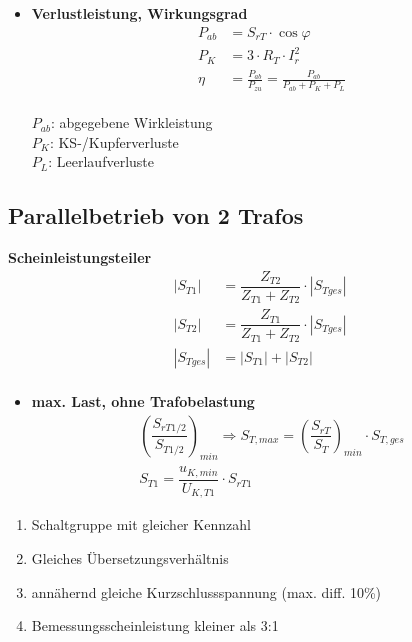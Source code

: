 \begin{itemize}
    \item[]{\textbf{Verlustleistung, Wirkungsgrad}}
\begin{align*}
    P_{ab} &= S_{rT} \cdot \cos \varphi\\
    P_K &= 3 \cdot R_T \cdot I^2_r\\
    \eta &= \frac{P_{ab}}{P_{zu}} = \frac{P_{ab}}{P_{ab}+P_K+P_L}
\end{align*}\\
$P_{ab}$: abgegebene Wirkleistung\\
$P_K$: KS-/Kupferverluste\\
$P_L$: Leerlaufverluste

\end{itemize}

\subsection{Parallelbetrieb von 2 Trafos}
\textbf{Scheinleistungsteiler}
\begin{align*}
    |S_{T1}| &= \dfrac{Z_{T2}}{Z_{T1} + Z_{T2}} \cdot |S_{Tges}|\\
    |S_{T2}| &= \dfrac{Z_{T1}}{Z_{T1} + Z_{T2}} \cdot |S_{Tges}|\\
    |S_{Tges}| &= |S_{T1}| + |S_{T2}|\\
\end{align*}
\begin{itemize}
    \item[]{\textbf{max. Last, ohne Trafobelastung}}
    \begin{gather*}
    \left(\dfrac{S_{rT1/2}}{S_{T1/2}}\right)_{min} \Rightarrow S_{T,max} = \left(\dfrac{S_{rT}}{S_T}\right)_{min} \cdot S_{T,ges}\\
    S_{T1} = \dfrac{u_{K,min}}{U_{K,T1}} \cdot S_{rT1}
    \end{gather*}
\end{itemize}

\begin{enumerate}
    \item Schaltgruppe mit gleicher Kennzahl
    \item Gleiches Übersetzungsverhältnis
    \item annähernd gleiche Kurzschlussspannung (max. diff. 10\%)
    \item Bemessungsscheinleistung kleiner als 3:1
\end{enumerate}
